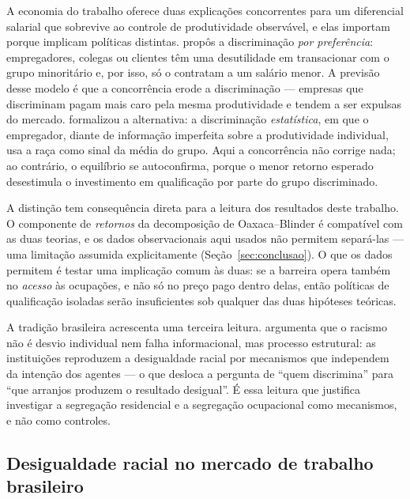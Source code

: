 \documentclass[12pt, a4paper, oneside]{article}
\let\oldsubsectionFB\subsection
\renewcommand{\subsection}{\FloatBarrier\oldsubsectionFB}
\begin{document}
A economia do trabalho oferece duas explicações concorrentes para um
diferencial salarial que sobrevive ao controle de produtividade observável, e
elas importam porque implicam políticas distintas.
 propôs a discriminação \emph{por preferência}: empregadores,
colegas ou clientes têm uma desutilidade em transacionar com o grupo
minoritário e, por isso, só o contratam a um salário menor. A previsão desse
modelo é que a concorrência erode a discriminação --- empresas que discriminam
pagam mais caro pela mesma produtividade e tendem a ser expulsas do mercado.
 formalizou a alternativa: a discriminação \emph{estatística},
em que o empregador, diante de informação imperfeita sobre a produtividade
individual, usa a raça como sinal da média do grupo. Aqui a concorrência não
corrige nada; ao contrário, o equilíbrio se autoconfirma, porque o menor retorno
esperado desestimula o investimento em qualificação por parte do grupo
discriminado.

A distinção tem consequência direta para a leitura dos resultados deste
trabalho. O componente de \emph{retornos} da decomposição de Oaxaca--Blinder é
compatível com as duas teorias, e os dados observacionais aqui usados não
permitem separá-las --- uma limitação assumida explicitamente
(Seção~\ref{sec:conclusao}). O que os dados permitem é testar uma implicação
comum às duas: se a barreira opera também no \emph{acesso} às ocupações, e
não só no preço pago dentro delas, então políticas de qualificação isoladas
serão insuficientes sob qualquer das duas hipóteses teóricas.

A tradição brasileira acrescenta uma terceira leitura. 
argumenta que o racismo não é desvio individual nem falha informacional, mas
processo estrutural: as instituições reproduzem a desigualdade racial por
mecanismos que independem da intenção dos agentes --- o que desloca a pergunta
de ``quem discrimina'' para ``que arranjos produzem o resultado desigual''. É
essa leitura que justifica investigar a segregação residencial e a segregação
ocupacional como mecanismos, e não como controles.

\subsection{Desigualdade racial no mercado de trabalho brasileiro}
\end{document}
